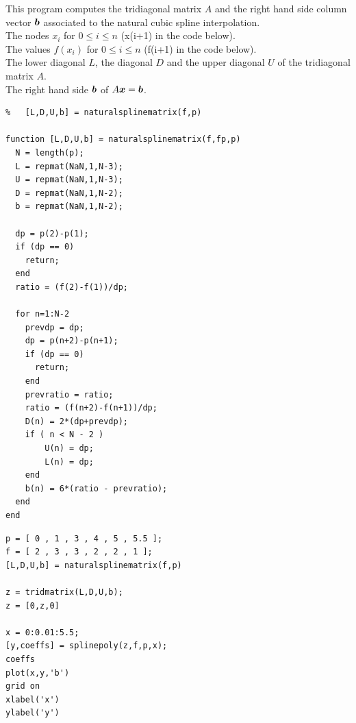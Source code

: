 \begin{code} \label{codeNCSI}
This program computes the tridiagonal matrix $A$ and the right hand
side column vector $\bm{b}$ associated to the natural cubic spline
interpolation.\\
 The nodes $x_i$ for $0 \leq i \leq n$ (x(i+1) in the code
below).\\
The values $f(x_i)$ for $0 \leq i \leq n$ (f(i+1) in the code
below).\\
 The lower diagonal $L$, the diagonal $D$ and the upper
diagonal $U$ of the tridiagonal matrix $A$.\\
The right hand side $\bm{b}$ of $A\bm{x} = \bm{b}$.
\small
\begin{verbatim}
%   [L,D,U,b] = naturalsplinematrix(f,p)

function [L,D,U,b] = naturalsplinematrix(f,fp,p)
  N = length(p);
  L = repmat(NaN,1,N-3);
  U = repmat(NaN,1,N-3);
  D = repmat(NaN,1,N-2);
  b = repmat(NaN,1,N-2);

  dp = p(2)-p(1);
  if (dp == 0)
    return;
  end
  ratio = (f(2)-f(1))/dp;

  for n=1:N-2
    prevdp = dp;
    dp = p(n+2)-p(n+1);
    if (dp == 0)
      return;
    end
    prevratio = ratio;
    ratio = (f(n+2)-f(n+1))/dp;
    D(n) = 2*(dp+prevdp);
    if ( n < N - 2 )
        U(n) = dp;
        L(n) = dp;
    end
    b(n) = 6*(ratio - prevratio);
  end
end
\end{verbatim}
\end{code}

\begin{code} \label{codeQuest2}
\small
\begin{verbatim}
p = [ 0 , 1 , 3 , 4 , 5 , 5.5 ];
f = [ 2 , 3 , 3 , 2 , 2 , 1 ];
[L,D,U,b] = naturalsplinematrix(f,p)

z = tridmatrix(L,D,U,b);
z = [0,z,0]

x = 0:0.01:5.5;
[y,coeffs] = splinepoly(z,f,p,x);
coeffs
plot(x,y,'b')
grid on
xlabel('x')
ylabel('y')
\end{verbatim}
\end{code}

